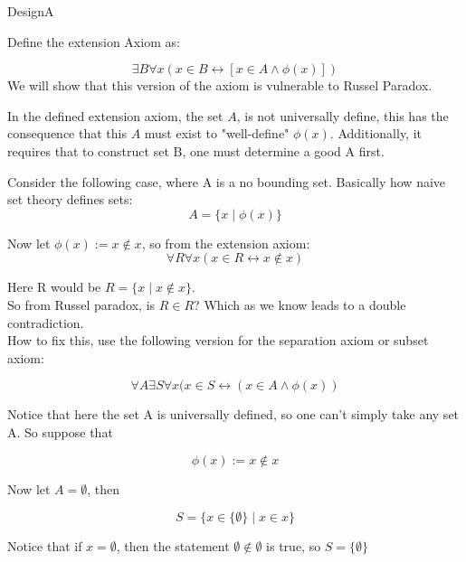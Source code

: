 \begin{assignment}{DesignA}
    

\useDesignAactivate
\subtitle{Extra: Fallacy with the Separation Axiom}

\begin{problema}
Define the extension Axiom as:

$$
\exists B \forall x ( x\in B \leftrightarrow [x \in A \land \phi(x)]) 
$$
We will show that this version of the axiom is vulnerable to Russel Paradox.
\begin{demostracion}
In the defined extension axiom, the set $A$, is not universally define, this has the consequence that this $A$ must exist to "well-define" $\phi(x)$. Additionally, it requires that to construct set B, one must determine a good A first. 

Consider the following case, where A is a no bounding set. Basically how naive set theory defines sets:
$$
A = \{x \mid \phi(x)\}
$$

Now let $\phi(x) := x \notin x$, so from the extension axiom:
$$
\forall R \forall x (x \in R \leftrightarrow x \notin x)
$$

Here R would be $R = \{ x \mid x \notin x \}$.\\ 

So from Russel paradox, is $R \in R$? Which as we know leads to a double contradiction.\\

How to fix this, use the following version for the separation axiom or subset axiom:

$$
\forall A \exists S \forall x (x \in S \leftrightarrow (x \in A \land \phi(x))
$$

Notice that here the set A is universally defined, so one can't simply take any set A. So suppose that

$$
\phi(x) := x \notin x
$$

Now let $A = {\emptyset}$, then 

$$
S = \{ x \in \{\emptyset\} \mid x \in x\}
$$

Notice that if $x = \emptyset$, then the statement $\emptyset \notin \emptyset$ is true, so $S = \{\emptyset\}$ 

\end{demostracion}
\end{problema}

\end{assignment}
